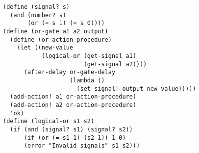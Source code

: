 \documentclass[a4paper,12pt]{article}
\begin{document}
\begin{lstlisting}
(define (signal? s)
  (and (number? s)
       (or (= s 1) (= s 0))))
(define (or-gate a1 a2 output)
  (define (or-action-procedure)
    (let ((new-value
           (logical-or (get-signal a1)
                       (get-signal a2))))
      (after-delay or-gate-delay
                   (lambda ()
                     (set-signal! output new-value)))))
  (add-action! a1 or-action-procedure)
  (add-action! a2 or-action-procedure)
  'ok)
(define (logical-or s1 s2)
  (if (and (signal? s1) (signal? s2))
      (if (or (= s1 1) (s2 1)) 1 0)
      (error "Invalid signals" s1 s2)))
\end{lstlisting}
\end{document}
